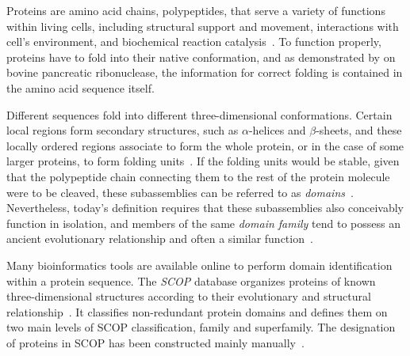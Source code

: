 \label{intro}

\label{intro:prodoms}

  Proteins are amino acid chains, polypeptides, that serve a variety of functions within
  living cells, including structural support and movement, interactions with cell's
  environment, and biochemical reaction catalysis~\cite{alberts2018molecular}.
  To function properly, proteins have to fold into their native conformation, and as
  demonstrated by \citet{anfinsen1961kinetics} on bovine pancreatic ribonuclease, the
  information for correct folding is contained in the amino acid sequence itself.

  Different sequences fold into different three-dimensional conformations.
  Certain local regions form secondary structures, such as $\alpha$-helices and
  $\beta$-sheets, and these locally ordered regions associate to form the whole protein,
  or in the case of some larger proteins, to form folding units~\cite{levitt1975computer}.
  If the folding units would be stable, given that the polypeptide chain connecting them
  to the rest of the protein molecule were to be cleaved, these subassemblies can be
  referred to as \emph{domains}~\cite{goldberg1969tertiary, levitt1975computer}.
  Nevertheless, today's definition requires that these subassemblies also conceivably
  function in isolation, and members of the same \emph{domain family} tend to possess an
  ancient evolutionary relationship and often a similar
  function~\cite{ponting2002natural}.

  Many bioinformatics tools are available online to perform domain identification within
  a protein sequence.
  The \emph{SCOP} database organizes proteins of known three-dimensional structures
  according to their evolutionary and structural relationship~\cite{murzin1995scop}.
  It classifies non-redundant protein domains and defines them on two main levels of SCOP
  classification, family and superfamily.
  The designation of proteins in SCOP has been constructed mainly
  manually~\cite{andreeva2020scop}.

